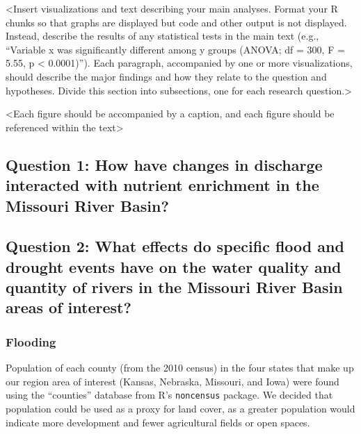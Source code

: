 \documentclass[12pt,]{article}
\begin{document}
\textless Insert visualizations and text describing your main analyses.
Format your R chunks so that graphs are displayed but code and other
output is not displayed. Instead, describe the results of any
statistical tests in the main text (e.g., ``Variable x was significantly
different among y groups (ANOVA; df = 300, F = 5.55, p \textless{}
0.0001)''). Each paragraph, accompanied by one or more visualizations,
should describe the major findings and how they relate to the question
and hypotheses. Divide this section into subsections, one for each
research question.\textgreater{}

\textless Each figure should be accompanied by a caption, and each
figure should be referenced within the text\textgreater{}

\hypertarget{question-1-how-have-changes-in-discharge-interacted-with-nutrient-enrichment-in-the-missouri-river-basin}{%
\subsection{Question 1: How have changes in discharge interacted with
nutrient enrichment in the Missouri River
Basin?}\label{question-1-how-have-changes-in-discharge-interacted-with-nutrient-enrichment-in-the-missouri-river-basin}}

\hypertarget{question-2-what-effects-do-specific-flood-and-drought-events-have-on-the-water-quality-and-quantity-of-rivers-in-the-missouri-river-basin-areas-of-interest}{%
\subsection{Question 2: What effects do specific flood and drought
events have on the water quality and quantity of rivers in the Missouri
River Basin areas of
interest?}\label{question-2-what-effects-do-specific-flood-and-drought-events-have-on-the-water-quality-and-quantity-of-rivers-in-the-missouri-river-basin-areas-of-interest}}

\hypertarget{flooding}{%
\subsubsection{Flooding}\label{flooding}}

Population of each county (from the 2010 census) in the four states that
make up our region area of interest (Kansas, Nebraska, Missouri, and
Iowa) were found using the ``counties'' database from R's
\texttt{noncensus} package. We decided that population could be used as
a proxy for land cover, as a greater population would indicate more
development and fewer agricultural fields or open spaces.
\end{document}

